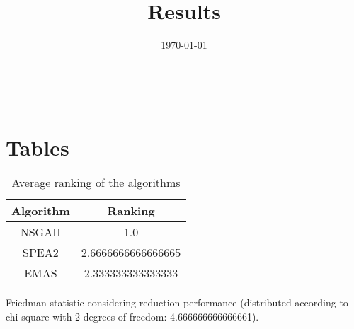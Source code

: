 \documentclass{article}
\title{Results}
\author{}
\date{\today}
\begin{document}
\oddsidemargin 0in \topmargin 0in\maketitle
\
\section{Tables}
\begin{table}[!htp]
\centering
\caption{Average ranking of the algorithms}
\begin{tabular}{c|c}
Algorithm&Ranking\\
\hline
NSGAII&1.0\\
SPEA2&2.6666666666666665\\
EMAS&2.333333333333333\\
\end{tabular}
\end{table}


Friedman statistic considering reduction performance (distributed according to chi-square with 2 degrees of freedom: 4.666666666666661).
\end{document}

